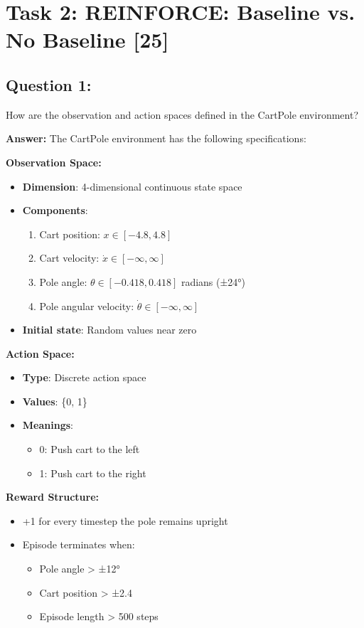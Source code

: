 \documentclass[12pt]{article}
\begin{document}
{{{\newpage

\section{Task 2: REINFORCE: Baseline vs. No Baseline [25]}

\subsection{Question 1:}

How are the observation and action spaces defined in the CartPole environment?
\vspace*{0.3cm}

\textbf{Answer:} The CartPole environment has the following specifications:

\textbf{Observation Space:}
\begin{itemize}
    \item \textbf{Dimension}: 4-dimensional continuous state space
    \item \textbf{Components}:
    \begin{enumerate}
        \item Cart position: $x \in [-4.8, 4.8]$
        \item Cart velocity: $\dot{x} \in [-\infty, \infty]$
        \item Pole angle: $\theta \in [-0.418, 0.418]$ radians (±24°)
        \item Pole angular velocity: $\dot{\theta} \in [-\infty, \infty]$
    \end{enumerate}
    \item \textbf{Initial state}: Random values near zero
\end{itemize}

\textbf{Action Space:}
\begin{itemize}
    \item \textbf{Type}: Discrete action space
    \item \textbf{Values}: \{0, 1\}
    \item \textbf{Meanings}: 
    \begin{itemize}
        \item 0: Push cart to the left
        \item 1: Push cart to the right
    \end{itemize}
\end{itemize}

\textbf{Reward Structure:}
\begin{itemize}
    \item +1 for every timestep the pole remains upright
    \item Episode terminates when:
    \begin{itemize}
        \item Pole angle > ±12°
        \item Cart position > ±2.4
        \item Episode length > 500 steps
    \end{itemize}
\end{itemize}

}}}
\end{document}
